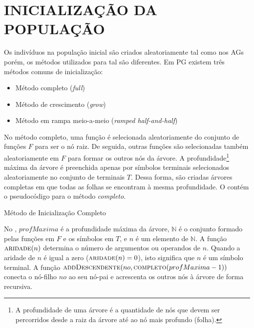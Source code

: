 \section{INICIALIZAÇÃO DA POPULAÇÃO}
\label{sec:2inicializacao}

Os indivíduos na população inicial são criados aleatoriamente tal como nos \acp{AG} porém, os métodos utilizados para tal 
são diferentes. Em \ac{PG} existem três métodos comuns de inicialização:

\begin{itemize}
\item{Método completo (\emph{full})}
\item{Método de crescimento (\emph{grow})}
\item{Método em rampa meio-a-meio (\emph{ramped half-and-half})} 
\end{itemize}

No método completo, uma função é selecionada aleatoriamente do conjunto de funções $F$ para ser o nó raiz. De seguida, outras funções são selecionadas 
também aleatoriamente em $F$ para formar os outros nós da árvore. A profundidade\footnote{A profundidade de uma árvore é a quantidade de nós que devem ser percorridos
desde a raiz da árvore até ao nó mais profundo (folha).} máxima da árvore é preenchida apenas por símbolos terminais selecionados 
aleatoriamente no conjunto de terminais $T$. Dessa forma, são criadas árvores completas em que todas as folhas se encontram à mesma 
profundidade. O  contém o pseudocódigo para o método \emph{completo}.

\begin{algorithm}[H]
	\caption{Método de Inicialização Completo}
	\label{Algoritmo231}
	\begin{algorithmic}[1]
			\Else
				\EndFor
			\EndIf
			\State {}
		\EndFunction
	\end{algorithmic}
\end{algorithm}

No , $profMaxima$ é a profundidade máxima da árvore, $\mathbb{N}$ é o conjunto formado pelas funções
em $F$ e os símbolos em $T$, e $n$ é um elemento de $\mathbb{N}$. A função $\Call{aridade}{n}$ determina o número de argumentos
ou operandos de $n$. Quando a aridade de $n$ é igual a zero ($\Call{aridade}{n} = 0$), isto significa que $n$ é um símbolo
terminal. A função $\Call{addDescendente}{no, \Call{completo}{profMaxima-1}}$ conecta o nó-filho $no$ ao seu nó-pai e acrescenta
os outros nós à árvore de forma recursiva.

